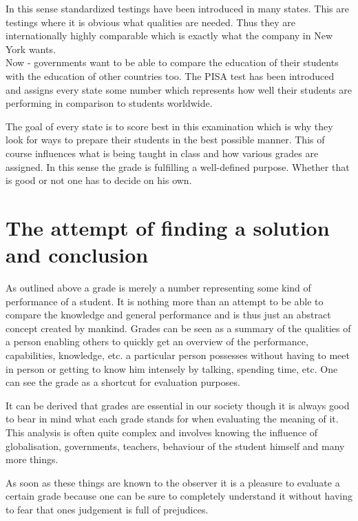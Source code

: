 \documentclass[12pt,a4paper]{article}
\begin{document}
  In this sense standardized testings have been introduced in many states. This are testings where it is obvious what qualities are needed. Thus they are internationally highly comparable which is exactly what the company in New York wants. \\
  
  Now - governments want to be able to compare the education of their students with the education of other countries too. The PISA test has been introduced and assigns every state some number which represents how well their students are performing in comparison to students worldwide. 
  
  The goal of every state is to score best in this examination which is why they look for ways to prepare their students in the best possible manner. This of course influences what is being taught in class and how various grades are assigned. In this sense the grade is fulfilling a well-defined purpose. Whether that is good or not one has to decide on his own.
  
  \section{The attempt of finding a solution and conclusion}
  As outlined above a grade is merely a number representing some kind of performance of a student. It is nothing more than an attempt to be able to compare the knowledge and general performance and is thus just an abstract concept created by mankind. Grades can be seen as a summary of the qualities of a person enabling others to quickly get an overview of the performance, capabilities, knowledge, etc. a particular person possesses without having to meet in person or getting to know him intensely by talking, spending time, etc. One can see the grade as a shortcut for evaluation purposes.
  
  It can be derived that grades are essential in our society though it is always good to bear in mind what each grade stands for when evaluating the meaning of it. This analysis is often quite complex and involves knowing the influence of globalisation, governments, teachers, behaviour of the student himself and many more things. 
  
  As soon as these things are known to the observer it is a pleasure to evaluate a certain grade because one can be sure to completely understand it without having to fear that ones judgement is full of prejudices.  
  
\end{document}
